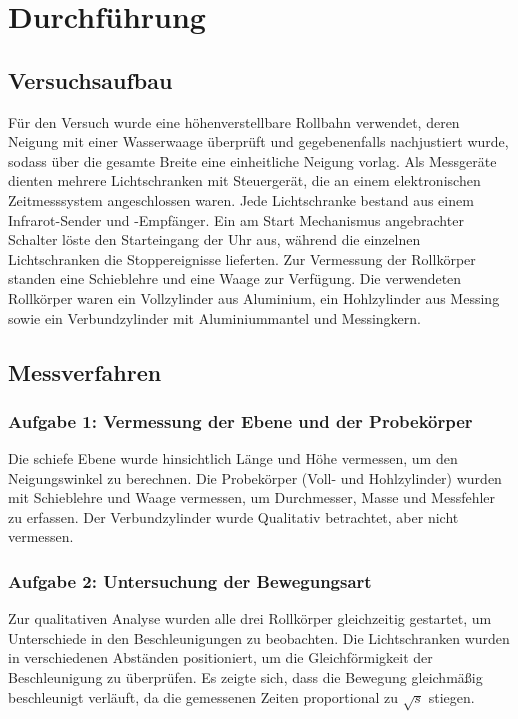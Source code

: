 \chapter{Durchführung}

\section{Versuchsaufbau}
Für den Versuch wurde eine höhenverstellbare Rollbahn verwendet, deren Neigung mit einer 
Wasserwaage überprüft und gegebenenfalls nachjustiert wurde, sodass über die gesamte Breite 
eine einheitliche Neigung vorlag. Als Messgeräte dienten mehrere Lichtschranken mit Steuergerät, 
die an einem elektronischen Zeitmesssystem angeschlossen waren. Jede Lichtschranke bestand aus 
einem Infrarot-Sender und -Empfänger. Ein am Start Mechanismus angebrachter Schalter löste 
den Starteingang der Uhr aus, während die einzelnen Lichtschranken die Stoppereignisse lieferten.  
Zur Vermessung der Rollkörper standen eine Schieblehre und eine Waage zur Verfügung. Die 
verwendeten Rollkörper waren ein Vollzylinder aus Aluminium, ein Hohlzylinder aus Messing 
sowie ein Verbundzylinder mit Aluminiummantel und Messingkern.  



\section{Messverfahren}

\subsection*{Aufgabe 1: Vermessung der Ebene und der Probekörper}
Die schiefe Ebene wurde hinsichtlich Länge und Höhe vermessen, um den Neigungswinkel zu berechnen.  
Die Probekörper (Voll- und Hohlzylinder) wurden mit Schieblehre und Waage vermessen, um 
Durchmesser, Masse und Messfehler zu erfassen. Der Verbundzylinder wurde Qualitativ betrachtet, 
aber nicht vermessen.

\subsection*{Aufgabe 2: Untersuchung der Bewegungsart}
Zur qualitativen Analyse wurden alle drei Rollkörper gleichzeitig gestartet, um Unterschiede in den 
Beschleunigungen zu beobachten. Die Lichtschranken wurden in verschiedenen Abständen positioniert, 
um die Gleichförmigkeit der Beschleunigung zu überprüfen. Es zeigte sich, dass die Bewegung 
gleichmäßig beschleunigt verläuft, da die gemessenen Zeiten proportional zu $\sqrt{s}$ stiegen.

